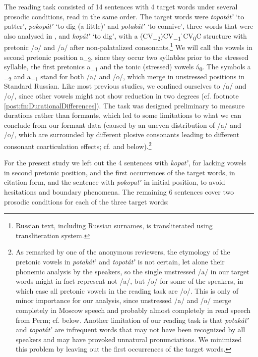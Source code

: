 \documentclass[output=paper,colorlinks,citecolor=black]{langscibook}
\begin{document}
The reading task consisted of 14 sentences with 4 target words under several prosodic conditions, read in the same order. The target words were \textit{topotátʼ} `to patter', \textit{pokopátʼ} `to dig (a little)' and \textit{potakátʼ} `to connive', three words that were also analysed in \citet{Vysotskij1973}, and \textit{kopátʼ} `to dig', with a (CV\textsubscript{\tiny{$-2$}})CV\textsubscript{\tiny{$-1$}}ˈCV\textsubscript{\tiny{$0$}}C structure with pretonic /o/ and /a/ after non-palatalized consonants.\footnote{Russian text, including Russian surnames, is transliterated using  transliteration system.} We will call the vowels in second pretonic position a\textsubscript{\tiny{$-2$}}, since they occur two syllables prior to the stressed syllable, the first pretonics a\textsubscript{\tiny{$-1$}} and the tonic (stressed) vowels á\textsubscript{\tiny{$0$}}. The symbols a\textsubscript{\tiny{$-2$}} and a\textsubscript{\tiny{$-1$}} stand for both /a/ and /o/, which merge in unstressed positions in Standard Russian. Like most previous studies, we confined ourselves to /a/ and /o/, since other vowels might not show reduction in two degrees (cf. footnote \ref{post:fn:DurationalDifferences}). The task was designed preliminary to measure durations rather than formants, which led to some limitations to what we can conclude from our formant data (caused by an uneven distribution of /a/ and /o/, which are surrounded by different plosive consonants leading to different consonant coarticulation effects; cf.  and  below).\footnote{As remarked by one of the anonymous reviewers, the etymology of the pretonic vowels in \textit{potakátʼ} and \textit{topotátʼ} is not certain, let alone their phonemic analysis by the speakers, so the single unstressed /a/ in our target words might in fact represent not /a/, but /o/ for some of the speakers, in which case all pretonic vowels in the reading task are /o/. This is only of minor importance for our analysis, since unstressed /a/ and /o/ merge completely in Moscow speech and probably almost completely in read speech from Perm; cf.  below. Another limitation of our reading task is that \textit{potakátʼ} and \textit{topotátʼ} are infrequent words that may not have been recognized by all speakers and may have provoked unnatural pronunciations. We minimized this problem by leaving out the first occurrences of the target words.}

For the present study we left out the 4 sentences with \textit{kopatʼ}, for lacking vowels in second pretonic position, and the first occurrences of the target words, in citation form, and the sentence with \textit{pokopatʼ} in initial position, to avoid hesitations and boundary phenomena. The remaining 6 sentences cover two prosodic conditions for each of the three target words:
\end{document}
